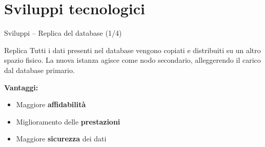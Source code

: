 \section{Sviluppi tecnologici}
\begin{frame}{Sviluppi – Replica del database (1/4)}
\begin{block}{Replica}
Tutti i dati presenti nel database vengono copiati e distribuiti su un altro spazio fisico. La nuova istanza agisce come nodo secondario, alleggerendo il carico dal database primario. 

\vspace{0.4cm}
\textbf{Vantaggi:}\vspace{0.1cm}
\begin{itemize}
  \item Maggiore \textbf{affidabilità}
  \item Miglioramento delle \textbf{prestazioni}
  \item Maggiore \textbf{sicurezza} dei dati
\end{itemize}\vspace{0.1cm}
\end{block}

\end{frame}

